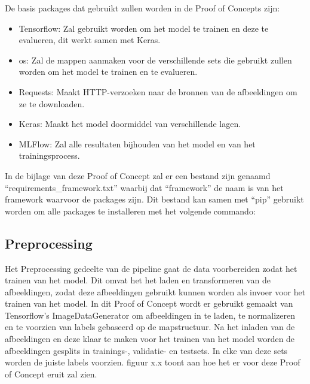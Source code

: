 De basis packages dat gebruikt zullen worden in de Proof of Concepts zijn:
\begin{itemize}
    \item Tensorflow: Zal gebruikt worden om het model te trainen en deze te evalueren, dit werkt samen met Keras.
    \item os: Zal de mappen aanmaken voor de verschillende sets die gebruikt zullen worden om het model te trainen en te evalueren.
    \item Requests: Maakt HTTP-verzoeken naar de bronnen van de afbeeldingen om ze te downloaden.
    \item Keras: Maakt het model doormiddel van verschillende lagen.
    \item MLFlow: Zal alle resultaten bijhouden van het model en van het trainingsprocess.
\end{itemize}

In de bijlage van deze Proof of Concept zal er een bestand zijn genaamd ``requirements\_framework.txt'' waarbij dat ``framework'' de naam is van het framework waarvoor de packages zijn. Dit bestand kan samen met ``pip'' gebruikt worden om alle packages te installeren met het volgende commando:


\subsection{Preprocessing}
Het Preprocessing gedeelte van de pipeline gaat de data voorbereiden zodat het trainen van het model. Dit omvat het het laden en transformeren van de afbeeldingen, zodat deze afbeeldingen gebruikt kunnen worden als invoer voor het trainen van het model. In dit Proof of Concept wordt er gebruikt gemaakt van Tensorflow's ImageDataGenerator om afbeeldingen in te laden, te normalizeren en te voorzien van labels gebaseerd op de mapstructuur. Na het inladen van de afbeeldingen en deze klaar te maken voor het trainen van het model worden de afbeeldingen gesplits in trainings-, validatie- en testsets. In elke van deze sets worden de juiste labels voorzien. figuur x.x toont aan hoe het er voor deze Proof of Concept eruit zal zien. 
